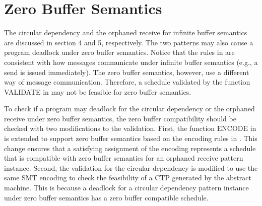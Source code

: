 \section{Zero Buffer Semantics}
The circular dependency and the orphaned receive for infinite buffer semantics are discussed in section 4 and 5, respectively. The two patterns may also cause a program deadlock under zero buffer semantics. Notice that the rules in  are consistent with how messages communicate under infinite buffer semantics (e.g., a send is issued immediately). 
The zero buffer semantics, however, use a different way of message communication. 
Therefore, a schedule validated by the function \textrm{VALIDATE} in  may not be feasible for zero buffer semantics. 

To check if a program may deadlock for the circular dependency or the orphaned receive under zero buffer semantics, the zero buffer compatibility \cite{HuangNFM15} should be checked with two modifications to the validation. 
First, the function $\mathrm{ENCODE}$ in  is extended to support zero buffer semantics based on the encoding rules in \cite{HuangNFM15}. This change ensures that a satisfying assignment of the encoding represents a schedule that is compatible with zero buffer semantics for an orphaned receive pattern instance.
Second, the validation for the circular dependency is modified to use the same SMT encoding to check the feasibility of a CTP generated by the abstract machine. This is because a deadlock for a circular dependency pattern instance under zero buffer semantics has a zero buffer compatible schedule.
